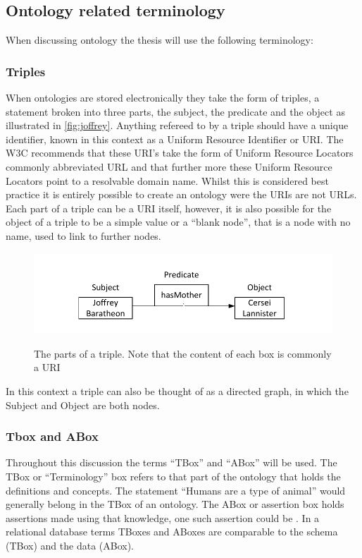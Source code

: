 \subsection{Ontology related terminology}

When discussing ontology the thesis will use the following terminology:

\subsubsection{Triples}\label{sec:trip}
When ontologies are stored electronically they take the form of triples, a statement broken into three parts, the subject, the predicate and the object as illustrated in \autoref{fig:joffrey}. Anything refereed to by a triple should have a unique identifier, known in this context as a Uniform Resource Identifier or URI. The W3C recommends that these URI's take the form of Uniform Resource Locators commonly abbreviated URL and that further more these Uniform Resource Locators point to a resolvable domain name. Whilst this is considered best practice it is entirely possible to create an ontology were the URIs are not URLs. Each part of a triple can be a URI itself, however, it is also possible for the object of a triple to be a simple value or a ``blank node'', that is a node with no name, used to link to further nodes.
\begin{figure}[hb]
    \myfloatalign
    {\includegraphics[width=\linewidth,keepaspectratio]{gfx/JofferyTriple}} 
    \caption[Triple]{The parts of a triple. Note that the content of each box is commonly a URI}
    \label{fig:joffrey}
\end{figure}
In this context a triple can also be thought of as a directed graph, in which the Subject and Object are both nodes.

\subsubsection{Tbox and ABox}
Throughout this discussion the terms ``TBox'' and ``ABox'' will be used. The TBox or ``Terminology'' box refers to that part of the ontology that holds the definitions and concepts. The statement ``Humans are a type of animal'' would generally belong in the TBox of an ontology. The ABox or assertion box holds assertions made using that knowledge, one such assertion could be . In a relational database terms TBoxes and ABoxes are comparable to the schema (TBox) and the data (ABox).

